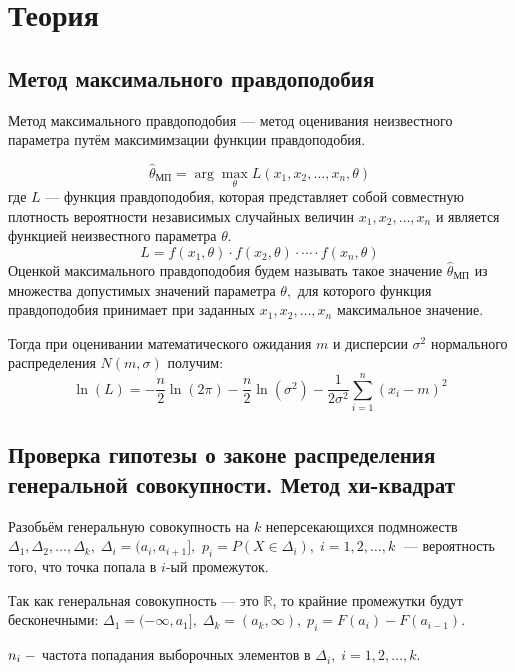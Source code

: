 \documentclass[12pt,a4paper]{article}
\begin{document}
	\section{Теория}
	\subsection{Метод максимального правдоподобия}
	Метод максимального правдоподобия --- метод оценивания неизвестного параметра путём максимимзации функции правдоподобия.
	
	\begin{equation}
	\hat{\theta}_{\text{МП}} = \arg \max_\theta L(x_1,x_2,\ldots,x_n,\theta)
	\end{equation}
	где $L$ --- функция правдоподобия, которая представляет собой совместную плотность вероятности независимых случайных величин $x_1,x_2,\ldots,x_n$ и является функцией неизвестного параметра $\theta$.
	\begin{equation}
	L = f(x_1,\theta)\cdot f(x_2,\theta)\cdot\cdots\cdot f(x_n,\theta)
	\end{equation}
	Оценкой максимального правдоподобия будем называть такое значение $\hat{\theta}_{\text{МП}}$ из множества допустимых значений параметра $\theta,$ для которого функция правдоподобия принимает при заданных $x_1, x_2, \ldots, x_n$ максимальное значение.
	
	Тогда при оценивании математического ожидания $m$ и дисперсии $\sigma^2$ нормального распределения $N(m,\sigma)$ получим:
	\begin{equation}
	\ln(L)=-\frac{n}{2}\ln(2\pi)-\frac{n}{2}\ln\left(\sigma^2\right)-\frac{1}{2\sigma^2}\sum\limits_{i=1}^n(x_i-m)^2
	\end{equation}
	
	\subsection{Проверка гипотезы о законе распределения генеральной совокупности. Метод хи-квадрат}
	Разобьём генеральную совокупность на $k$ неперсекающихся подмножеств $\Delta_1, \Delta_2,\ldots, \Delta_k,\;\Delta_i = (a_i,a_{i+1}],$ $p_i = P(X\in\Delta_i),\;i=1,2,\ldots,k\;$ --- вероятность того, что точка попала в $i$-ый промежуток.
	
	Так как генеральная совокупность --- это $\mathbb{R}$, то крайние промежутки будут бесконечными: $\Delta_1 = (-\infty,a_1], \;\Delta_k = (a_k,\infty), \;p_i = F(a_i) - F(a_{i-1})$.
	
	$n_i\;\--$ частота попадания выборочных элементов в $\Delta_i,\;i=1,2,\ldots,k.$
	
\end{document}

